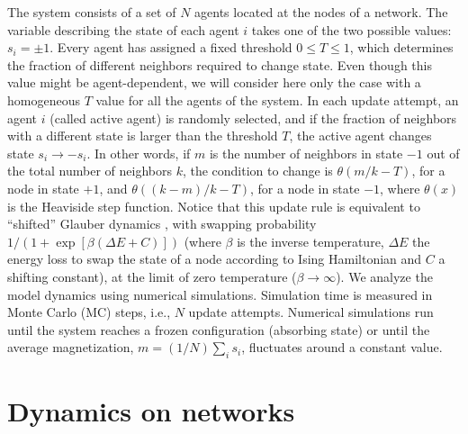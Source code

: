 The system consists of a set of $N$ agents located at the nodes of a network. The variable describing the state of each agent $i$ takes one of the two possible values: $s_i = \pm 1$. Every agent has assigned a fixed threshold $0 \leq T \leq 1$, which determines the fraction of different neighbors required to change state. Even though this value might be agent-dependent, we will consider here only the case with a homogeneous $T$ value for all the agents of the system. In each update attempt, an agent $i$ (called active agent) is randomly selected, and if the fraction of neighbors with a different state is larger than the threshold $T$, the active agent changes state $s_i \to -s_i$. In other words, if $m$ is the number of neighbors in state $-1$ out of the total number of neighbors $k$, the condition to change is $\theta(m/k - T)$, for a node in state $+1$, and $\theta((k-m)/k - T)$, for a node in state $-1$, where $\theta(x)$ is the Heaviside step function. Notice that this update rule is equivalent to ``shifted'' Glauber dynamics \cite{glauber1963time}, with swapping probability $1/(1+\exp[\beta(\Delta E + C)])$ (where $\beta$ is the inverse temperature, $\Delta E$ the energy loss to swap the state of a node according to Ising Hamiltonian and $C$ a shifting constant), at the limit of zero temperature ($\beta \to \infty$). We analyze the model dynamics using numerical simulations. Simulation time is measured in Monte Carlo (MC) steps, i.e., $N$ update attempts. Numerical simulations run until the system reaches a frozen configuration (absorbing state) or until the average magnetization, $m = (1/N) \sum_i s_i$, fluctuates around a constant value.

\section{\label{sec:Dynamics on networks} Dynamics on networks}


